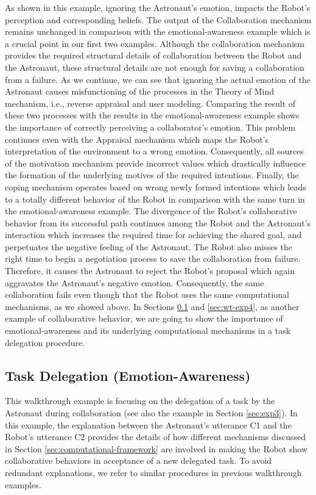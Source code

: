 As shown in this example, ignoring the Astronaut's emotion, impacts the Robot's
perception and corresponding beliefs. The output of the Collaboration mechanism
remains unchanged in comparison with the emotional-awareness example which is a
crucial point in our first two examples. Although the collaboration mechanism
provides the required structural details of collaboration between the Robot and
the Astronaut, these structural details are not enough for saving a
collaboration from a failure. As we continue, we can see that ignoring the
actual emotion of the Astronaut causes misfunctioning of the processes in the
Theory of Mind mechanism, i.e., reverse appraisal and user modeling. Comparing
the result of these two processes with the results in the emotional-awareness
example shows the importance of correctly perceiving a collaborator's emotion.
This problem continues even with the Appraisal mechanism which maps the Robot's
interpretation of the environment to a wrong emotion. Consequently, all
sources of the motivation mechanism provide incorrect values which drastically
influence the formation of the underlying motives of the required intentions.
Finally, the coping mechanism operates based on wrong newly formed intentions
which leads to a totally different behavior of the Robot in comparison with the
same turn in the emotional-awareness example. The divergence of the Robot's
collaborative behavior from its successful path continues among the Robot and
the Astronaut's interaction which increases the required time for achieving the
shared goal, and perpetuates the negative feeling of the Astronaut. The Robot
also misses the right time to begin a negotiation process to save the
collaboration from failure. Therefore, it causes the Astronaut to reject the
Robot's proposal which again aggravates the Astronaut's negative emotion.
Consequently, the same collaboration fails even though that the Robot uses the
same computational mechanisms, as we showed above. In Sections \ref{sec:wt-exp3}
and \ref{sec:wt-exp4}, as another example of collaborative behavior, we are
going to show the importance of emotional-awareness and its underlying
computational mechanisms in a task delegation procedure.

\subsection{Task Delegation (Emotion-Awareness)}
\label{sec:wt-exp3}

This walkthrough example is focusing on the delegation of a task by the
Astronaut during collaboration (see also the example in Section \ref{sec:exp3}).
In this example, the explanation between the Astronaut's utterance C1 and the
Robot's utterance C2 provides the details of how different mechanisms discussed
in Section \ref{sec:computational-framework} are involved in making the Robot 
show collaborative behaviors in acceptance of a new delegated task. To avoid
redundant explanations, we refer to similar procedures in previous walkthrough
examples.\\

